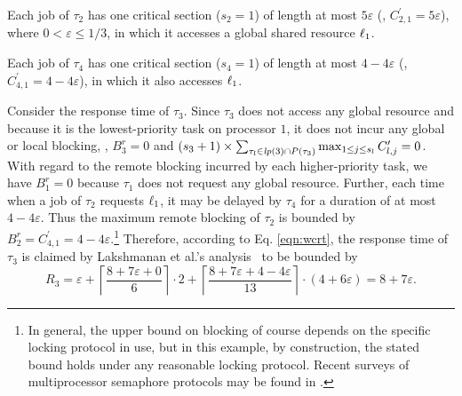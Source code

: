 Each job of $\tau_2$ has one critical section ($s_2 = 1$) of length at most $5\varepsilon$ (\ie, $C_{2,1}^{\prime} = 5\varepsilon$), where $0 < \varepsilon \leq 1/3$, in which it accesses a global shared resource $\ell_1$.

Each job of $\tau_4$ has one critical section ($s_4 = 1$) of length at most $4-4\varepsilon$ (\ie, $C_{4,1}^{\prime} = 4-4\varepsilon$), in which it also accesses $\ell_1$.

Consider the response time of $\tau_3$. Since $\tau_3$ does not access any global resource and because it is the lowest-priority task on processor $1$, it does not incur any global or local blocking, \ie, $B_3^r = 0$ and $(s_3+1) \times \sum_{\tau_l \in \mathit{lp}(3) \cap P(\tau_3)} \max_{1 \leq j \leq s_l} C_{l,j}^{\prime} = 0$. With regard to the remote blocking incurred by each higher-priority task, we have $B_1^r = 0$ because $\tau_1$ does not request any global resource. Further, each time when a job of $\tau_2$ requests $\ell_1$, it may be delayed by $\tau_4$ for a duration of at most $4-4\varepsilon$. Thus the maximum remote blocking of $\tau_2$ is bounded by $B_2^r = C_{4,1}^{\prime} = 4-4\varepsilon$.\footnote{In general, the upper bound on blocking of course depends on the specific locking protocol in use, but in this example, by construction, the stated bound holds under any reasonable locking protocol. Recent surveys of multiprocessor semaphore protocols may be found in \cite{bbb-2013,yang-2015}.} Therefore, according to Eq. \eqref{eqn:wcrt}, the response time of $\tau_3$ is claimed by  Lakshmanan et al.'s analysis~\cite{lakshmanan-2009} to be bounded by
\begin{equation*}
R_3 = \varepsilon + \left \lceil \frac{8+7\varepsilon + 0}{6} \right \rceil \cdot 2 + \left \lceil \frac{8+7\varepsilon + 4-4\varepsilon}{13} \right \rceil \cdot (4+6\varepsilon) = 8+7\varepsilon.
\end{equation*}

